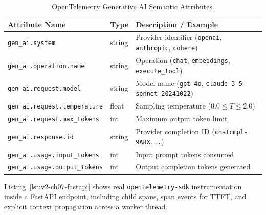 \begin{table}[htbp]
\centering
\small
\begin{tabular}{lll}
\toprule
\textbf{Attribute Name} & \textbf{Type} & \textbf{Description / Example} \\
\midrule
\texttt{gen\_ai.system} & string & Provider identifier (\texttt{openai}, \texttt{anthropic}, \texttt{cohere}) \\
\texttt{gen\_ai.operation.name} & string & Operation (\texttt{chat}, \texttt{embeddings}, \texttt{execute\_tool}) \\
\texttt{gen\_ai.request.model} & string & Model name (\texttt{gpt-4o}, \texttt{claude-3-5-sonnet-20241022}) \\
\texttt{gen\_ai.request.temperature} & float & Sampling temperature ($0.0 \le T \le 2.0$) \\
\texttt{gen\_ai.request.max\_tokens} & int & Maximum output token limit \\
\texttt{gen\_ai.response.id} & string & Provider completion ID (\texttt{chatcmpl-9A8X...}) \\
\texttt{gen\_ai.usage.input\_tokens} & int & Input prompt tokens consumed \\
\texttt{gen\_ai.usage.output\_tokens} & int & Output completion tokens generated \\
\bottomrule
\end{tabular}
\caption{OpenTelemetry Generative AI Semantic Attributes.}
\label{tab:v2-ch07-otel}
\end{table}

Listing~\ref{lst:v2-ch07-fastapi} shows real \texttt{opentelemetry-sdk} instrumentation inside a FastAPI endpoint, including child spans, span events for TTFT, and explicit context propagation across a worker thread.

